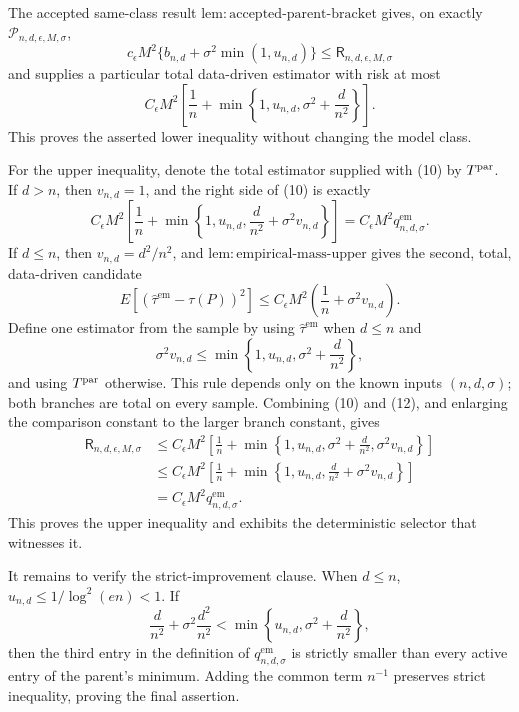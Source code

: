 The accepted same-class result \(\mathrm{lem:accepted\text{-}parent\text{-}bracket}\) gives, on exactly \(\mathcal P_{n,d,\epsilon,M,\sigma}\),
\[
 c_{\epsilon}M^2\{b_{n,d}+\sigma^2\min(1,u_{n,d})\}
 \leq\mathsf R_{n,d,\epsilon,M,\sigma}
\]
and supplies a particular total data-driven estimator with risk at most
\[
 C_{\epsilon}M^2\left[\frac1n+
 \min\left\{1,u_{n,d},\sigma^2+\frac d{n^2}\right\}\right]. \tag{10}
\]
This proves the asserted lower inequality without changing the model class.

For the upper inequality, denote the total estimator supplied with (10) by \(T^{\rm par}\).  If \(d>n\), then \(v_{n,d}=1\), and the right side of (10) is exactly
\[
 C_{\epsilon}M^2\left[\frac1n+
 \min\left\{1,u_{n,d},\frac d{n^2}+\sigma^2v_{n,d}\right\}\right]
 =C_{\epsilon}M^2q_{n,d,\sigma}^{\mathrm{em}}. \tag{11}
\]
If \(d\leq n\), then \(v_{n,d}=d^2/n^2\), and \(\mathrm{lem:empirical\text{-}mass\text{-}upper}\) gives the second, total, data-driven candidate
\[
 E[(\widehat\tau^{\mathrm{em}}-\tau(P))^2]
 \leq C_{\epsilon}M^2\left(\frac1n+\sigma^2v_{n,d}\right). \tag{12}
\]
Define one estimator from the sample by using \(\widehat\tau^{\mathrm{em}}\) when \(d\leq n\) and
\[
 \sigma^2v_{n,d}
 \leq\min\left\{1,u_{n,d},\sigma^2+\frac d{n^2}\right\},
\]
and using \(T^{\rm par}\) otherwise.  This rule depends only on the known inputs \((n,d,\sigma)\); both branches are total on every sample.  Combining (10) and (12), and enlarging the comparison constant to the larger branch constant, gives
\[
 \begin{aligned}
 \mathsf R_{n,d,\epsilon,M,\sigma}
 &\leq C_{\epsilon}M^2\left[\frac1n+
 \min\left\{1,u_{n,d},\sigma^2+\frac d{n^2},\sigma^2v_{n,d}\right\}\right]\\
 &\leq C_{\epsilon}M^2\left[\frac1n+
 \min\left\{1,u_{n,d},\frac d{n^2}+\sigma^2v_{n,d}\right\}\right]\\
 &=C_{\epsilon}M^2q_{n,d,\sigma}^{\mathrm{em}}.
 \end{aligned}
\]
This proves the upper inequality and exhibits the deterministic selector that witnesses it.

It remains to verify the strict-improvement clause.  When \(d\leq n\),
\(
 u_{n,d}\leq1/\log^2(en)<1
\).
If
\[
 \frac d{n^2}+\sigma^2\frac{d^2}{n^2}
 <\min\left\{u_{n,d},\sigma^2+\frac d{n^2}\right\},
\]
then the third entry in the definition of \(q_{n,d,\sigma}^{\mathrm{em}}\) is strictly smaller than every active entry of the parent's minimum.  Adding the common term \(n^{-1}\) preserves strict inequality, proving the final assertion.

